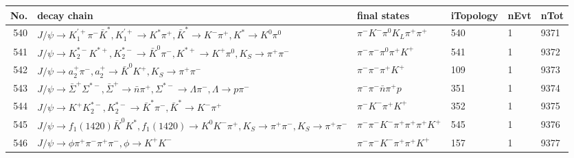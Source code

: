 \begin{table}[htbp] 
\begin{center}
\begin{small}
\begin{tabular}{rlllll}\hline\hline
 No. & decay chain & final states &  iTopology & nEvt & nTot \\\hline
540&$J/\psi       \rightarrow K_1^{'+}      \pi^{-}        \bar{K}^{*}   , K_1^{'+}       \rightarrow K^{*}          \pi^{+}        , \bar{K}^{*}    \rightarrow K^{-}          \pi^{+}        , K^{*}           \rightarrow K^{0}          \pi^{0}        $&$\pi^{-}        K^{-}          \pi^{0}        K_{L}          \pi^{+}        \pi^{+}        $&  540&    1& 9371\\
541&$J/\psi       \rightarrow K_2^{*-}       K^{*+}         , K_2^{*-}        \rightarrow \bar{K}^{0}   \pi^{-}        , K^{*+}          \rightarrow K^{+}          \pi^{0}        , K_{S}           \rightarrow \pi^{+}        \pi^{-}        $&$\pi^{-}        \pi^{-}        \pi^{0}        \pi^{+}        K^{+}          $&  541&    1& 9372\\
542&$J/\psi       \rightarrow a_{2}^{+}      \pi^{-}        , a_{2}^{+}       \rightarrow \bar{K}^{0}   K^{+}          , K_{S}           \rightarrow \pi^{+}        \pi^{-}        $&$\pi^{-}        \pi^{-}        \pi^{+}        K^{+}          $&  109&    1& 9373\\
543&$J/\psi       \rightarrow \bar{\Sigma}^+   \Sigma^{*-}       , \bar{\Sigma}^+    \rightarrow \bar{n}          \pi^{+}        , \Sigma^{*-}        \rightarrow \Lambda           \pi^{-}        , \Lambda            \rightarrow p                 \pi^{-}        $&$\pi^{-}        \pi^{-}        \bar{n}          \pi^{+}        p                 $&  351&    1& 9374\\
544&$J/\psi       \rightarrow K^{+}          K_2^{*-}       , K_2^{*-}        \rightarrow \bar{K}^{*}   \pi^{-}        , \bar{K}^{*}    \rightarrow K^{-}          \pi^{+}        $&$\pi^{-}        K^{-}          \pi^{+}        K^{+}          $&  352&    1& 9375\\
545&$J/\psi       \rightarrow f_{1}(1420)    \bar{K}^{0}   K^{*}          , f_{1}(1420)     \rightarrow K^{0}          K^{-}          \pi^{+}        , K_{S}           \rightarrow \pi^{+}        \pi^{-}        , K_{S}           \rightarrow \pi^{+}        \pi^{-}        $&$\pi^{-}        \pi^{-}        K^{-}          \pi^{+}        \pi^{+}        \pi^{+}        K^{+}          $&  545&    1& 9376\\
546&$J/\psi       \rightarrow \phi           \pi^{+}        \pi^{-}        \pi^{+}        \pi^{-}        , \phi            \rightarrow K^{+}          K^{-}          $&$\pi^{-}        \pi^{-}        K^{-}          \pi^{+}        \pi^{+}        K^{+}          $&  157&    1& 9377\\

\end{tabular}
\end{small}
\end{center}
\end{table}
